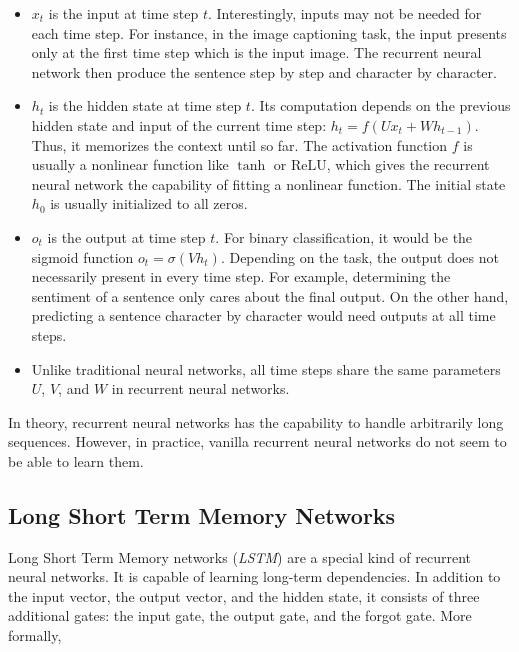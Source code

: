         \begin{itemize}
            \item $x_t$ is the input at time step $t$.
                Interestingly, inputs may not be needed for each time step.
                For instance, in the image captioning task,
                the input presents only at the first time step which is the input image.
                The recurrent neural network then produce the sentence step by step and character by character.
            \item $h_t$ is the hidden state at time step $t$.
                Its computation depends on the previous hidden state and input of the current time step:
                $h_t = f(Ux_t + Wh_{t-1})$.
                Thus, it memorizes the context until so far.
                The activation function $f$ is usually a nonlinear function like $\tanh$ or $\mathrm{ReLU}$,
                which gives the recurrent neural network the capability of fitting a nonlinear function.
                The initial state $h_0$ is usually initialized to all zeros.
            \item $o_t$ is the output at time step $t$.
                For binary classification, it would be the sigmoid function $o_t = \sigma(Vh_t)$.
                Depending on the task, the output does not necessarily present in every time step.
                For example, determining the sentiment of a sentence only cares about the final output.
                On the other hand, predicting a sentence character by character would need outputs at all time steps.
            \item Unlike traditional neural networks,
                all time steps share the same parameters $U$, $V$, and $W$ in recurrent neural networks.
        \end{itemize}

        In theory, recurrent neural networks has the capability to handle arbitrarily long sequences.
        However, in practice, vanilla recurrent neural networks do not seem to be able to learn them.
        \cite{Pascanu2013}

    \subsection{Long Short Term Memory Networks}

        Long Short Term Memory networks (\emph{LSTM}) are a special kind of recurrent neural networks.
        It is capable of learning long-term dependencies.
        In addition to the input vector, the output vector, and the hidden state,
        it consists of three additional gates: the input gate, the output gate, and the forgot gate.
        More formally,

